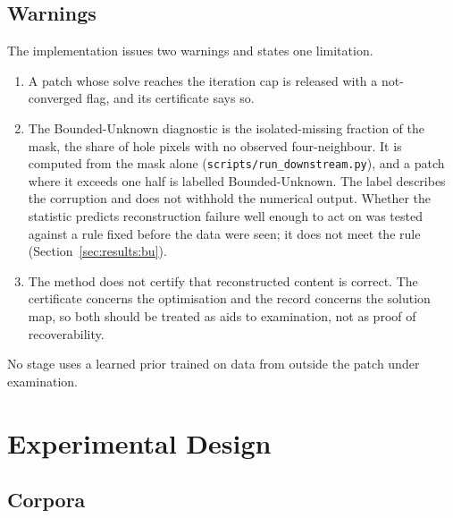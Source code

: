 \documentclass[final,3p]{elsarticle}
\begin{document}
\subsection{Warnings}
\label{sec:framework:warnings}

The implementation issues two warnings and states one limitation.
\begin{enumerate}
  \item A patch whose solve reaches the iteration cap is released with a not-converged flag, and its certificate says so.
  \item The Bounded-Unknown diagnostic is the isolated-missing fraction of the mask, the share of hole pixels with no observed four-neighbour. It is computed from the mask alone (\texttt{scripts/\allowbreak run\allowbreak\_downstream.py}), and a patch where it exceeds one half is labelled Bounded-Unknown. The label describes the corruption and does not withhold the numerical output. Whether the statistic predicts reconstruction failure well enough to act on was tested against a rule fixed before the data were seen; it does not meet the rule (Section~\ref{sec:results:bu}).
  \item The method does not certify that reconstructed content is correct. The certificate concerns the optimisation and the record concerns the solution map, so both should be treated as aids to examination, not as proof of recoverability.
\end{enumerate}
No stage uses a learned prior trained on data from outside the patch under examination.

\section{Experimental Design}
\label{sec:experiments}

\subsection{Corpora}
\label{sec:experiments:corpora}
\end{document}
